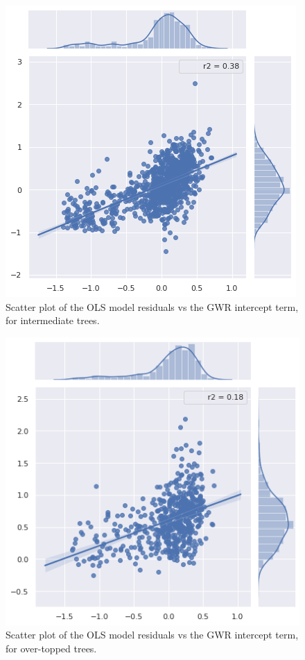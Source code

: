 \documentclass[12pt,a4paper]{article}
\begin{document}
\begin{figure}[H]
\centering
\includegraphics[scale=.65]{../figures/ModelComparison_Cnpy=4.png}
\caption{Scatter plot of the OLS model residuals vs the GWR intercept term, for intermediate trees.}
\label{ModelComparison_Cnpy4} 
\end{figure}

\begin{figure}[H]
\centering
\includegraphics[scale=.65]{../figures/ModelComparison_Cnpy=5.png}
\caption{Scatter plot of the OLS model residuals vs the GWR intercept term, for over-topped trees.}
\label{ModelComparison_Cnpy5} 
\end{figure}
\end{document}
